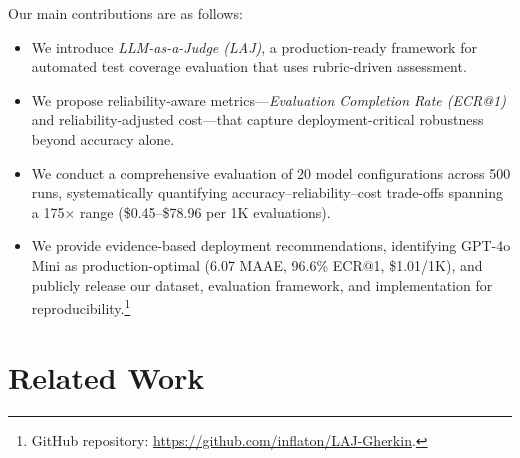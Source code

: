 \documentclass[letterpaper]{article} %
\newcommand{\add}[1]{\textcolor{blue}{#1}}
\newcommand{\add}[1]{#1}
\begin{document}
Our main contributions are as follows:
\begin{itemize}
    \item We introduce \emph{LLM-as-a-Judge (LAJ)}, a production-ready framework for automated test coverage evaluation that uses rubric-driven assessment.%
    \item We propose reliability-aware metrics—\emph{Evaluation Completion Rate (ECR@1)} and reliability-adjusted cost—that capture deployment-critical robustness beyond accuracy alone.
    \item We conduct a comprehensive evaluation of 20 model configurations across 500 runs, %
    systematically quantifying accuracy–reliability–cost trade-offs spanning a 175$\times$ range (\$0.45--\$78.96 per 1K evaluations).
    \item We provide evidence-based deployment recommendations, identifying GPT-4o Mini as production-optimal (6.07 MAAE, 96.6\% ECR@1, \$1.01/1K), and publicly release our dataset, evaluation framework, and implementation for reproducibility.\add{\footnote{GitHub repository: \url{https://github.com/inflaton/LAJ-Gherkin}.}}
\end{itemize}


\section{Related Work}
\end{document}
